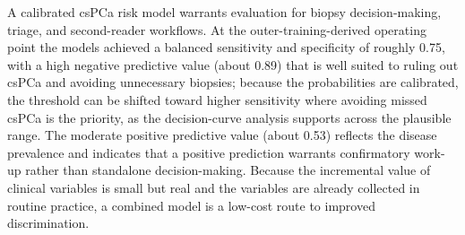 \documentclass[11pt]{article}
\begin{document}
A calibrated csPCa risk model warrants evaluation for biopsy decision-making,
triage, and second-reader workflows. At the outer-training-derived operating
point the models
achieved a balanced sensitivity and specificity of roughly 0.75, with a high
negative predictive value (about 0.89) that is well suited to ruling out csPCa
and avoiding unnecessary biopsies; because the probabilities are calibrated, the
threshold can be shifted toward higher sensitivity where avoiding missed csPCa is
the priority, as the decision-curve analysis supports across the plausible range.
The moderate positive predictive value (about 0.53) reflects the disease
prevalence and indicates that a positive prediction warrants confirmatory work-up
rather than standalone decision-making. Because the incremental value of clinical
variables is small but real and the variables are already collected in routine
practice, a combined model is a low-cost route to improved discrimination.
\end{document}
